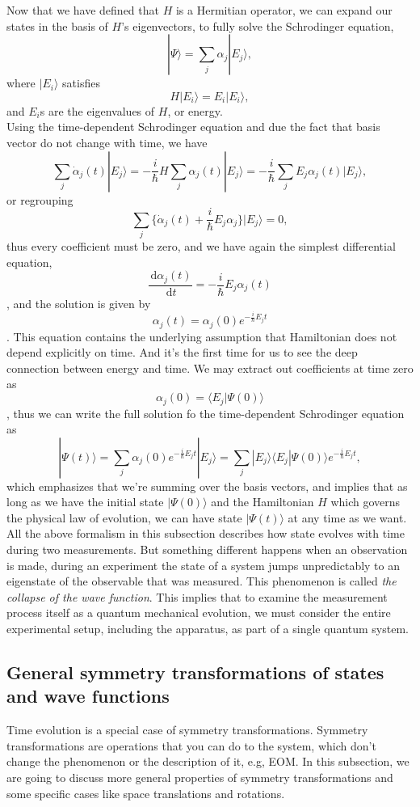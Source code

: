 \documentclass{article}
\newcommand{\be}{\begin{equation}}
\newcommand{\ee}{\end{equation}}
\newcommand{\dif}{\,\mathrm{d}}
\renewcommand{\1}{\left}
\renewcommand{\2}{\right}
\newcommand{\la}{\langle}
\newcommand{\ra}{\rangle}
\newcommand{\al}{\alpha}
\begin{document}
Now that we have defined that $H$ is a Hermitian operator, we can expand our states in the basis of $H$'s eigenvectors, to fully solve the Schrodinger equation,
\be
|\Psi\ra=\sum_j\al_j|E_j\ra,
\ee
where $|E_i\ra$ satisfies
\be
H|E_i\ra=E_i|E_i\ra,
\ee
and $E_i$s are the eigenvalues of $H$, or energy.\\
Using the time-dependent Schrodinger equation and due the fact that basis vector do not change with time, we have
\be
\sum_j\dot\al_j(t)|E_j\ra=-\frac i \hbar H\sum_j\al_j(t)|E_j\ra=-\frac i \hbar \sum_jE_j\al_j(t)|E_j\ra,
\ee
or regrouping
\be
\sum_j\bigg\{\dot\al_j(t)+\frac i \hbar E_j\al_j\bigg\}|E_j\ra=0,
\ee
thus every coefficient must be zero, and we have again the simplest differential equation,
\be\frac{\dif \al_j(t)}{\dif t}=-\frac i \hbar E_j \al_j(t)\ee,
and the solution is given by
\be\al_j(t)=\al_j(0)e^{-\frac i\hbar E_j t}\ee.
This equation contains the underlying assumption that Hamiltonian does not depend explicitly on time. And it's the first time for us to see the deep connection between energy and time.
We may extract out coefficients at time zero as \be\al_j(0)=\la E_j|\Psi(0)\ra\ee, thus we can write the full solution fo the time-dependent Schrodinger equation as
\be
|\Psi(t)\ra=\sum_j\al_j(0)e^{-\frac i\hbar E_jt}|E_j\ra=\sum_j|E_j\ra\la E_j|\Psi(0)\ra e^{-\frac i\hbar E_jt},
\ee
which emphasizes that we're summing over the basis vectors, and implies that as long as we have the initial state $|\Psi(0)\ra$ and the Hamiltonian $H$ which governs the physical law of evolution, we can have state $|\Psi(t)\ra$ at any time as we want.\\

All the above formalism in this subsection describes how state evolves with time during two measurements. But something different happens when an observation is made, during an experiment the state of a system jumps unpredictably to an eigenstate of the observable that was measured. This phenomenon is called \textit{the collapse of the wave function}. This implies that to examine the measurement process itself as a quantum mechanical evolution, we must consider the entire experimental setup, including the apparatus, as part of a single quantum system.

\subsection{General symmetry transformations of states and wave functions}
Time evolution is a special case of symmetry transformations. Symmetry transformations are operations that you can do to the system, which don't change the phenomenon or the description of it, e.g, EOM. In this subsection, we are going to discuss more general properties of symmetry transformations and some specific cases like space translations and rotations.\\
\end{document}
